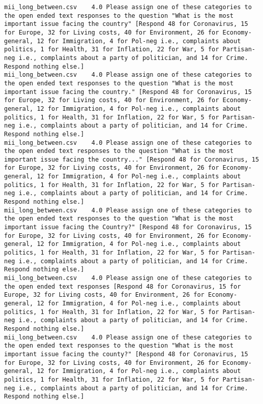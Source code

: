 \begin{lstlisting}
mii_long_between.csv	4.0	Please assign one of these categories to the open ended text responses to the question "What is the most important issue facing the country" [Respond 48 for Coronavirus, 15 for Europe, 32 for Living costs, 40 for Environment, 26 for Economy-general, 12 for Immigration, 4 for Pol-neg i.e., complaints about politics, 1 for Health, 31 for Inflation, 22 for War, 5 for Partisan-neg i.e., complaints about a party of politician, and 14 for Crime. Respond nothing else.]
mii_long_between.csv	4.0	Please assign one of these categories to the open ended text responses to the question "What is the most important issue facing the country." [Respond 48 for Coronavirus, 15 for Europe, 32 for Living costs, 40 for Environment, 26 for Economy-general, 12 for Immigration, 4 for Pol-neg i.e., complaints about politics, 1 for Health, 31 for Inflation, 22 for War, 5 for Partisan-neg i.e., complaints about a party of politician, and 14 for Crime. Respond nothing else.]
mii_long_between.csv	4.0	Please assign one of these categories to the open ended text responses to the question "What is the most important issue facing the country..." [Respond 48 for Coronavirus, 15 for Europe, 32 for Living costs, 40 for Environment, 26 for Economy-general, 12 for Immigration, 4 for Pol-neg i.e., complaints about politics, 1 for Health, 31 for Inflation, 22 for War, 5 for Partisan-neg i.e., complaints about a party of politician, and 14 for Crime. Respond nothing else.]
mii_long_between.csv	4.0	Please assign one of these categories to the open ended text responses to the question "What is the most important issue facing the Country?" [Respond 48 for Coronavirus, 15 for Europe, 32 for Living costs, 40 for Environment, 26 for Economy-general, 12 for Immigration, 4 for Pol-neg i.e., complaints about politics, 1 for Health, 31 for Inflation, 22 for War, 5 for Partisan-neg i.e., complaints about a party of politician, and 14 for Crime. Respond nothing else.]
mii_long_between.csv	4.0	Please assign one of these categories to the open ended text responses [Respond 48 for Coronavirus, 15 for Europe, 32 for Living costs, 40 for Environment, 26 for Economy-general, 12 for Immigration, 4 for Pol-neg i.e., complaints about politics, 1 for Health, 31 for Inflation, 22 for War, 5 for Partisan-neg i.e., complaints about a party of politician, and 14 for Crime. Respond nothing else.]
mii_long_between.csv	4.0	Please assign one of these categories to the open ended text responses to the question "What is the most important issue facing the county?" [Respond 48 for Coronavirus, 15 for Europe, 32 for Living costs, 40 for Environment, 26 for Economy-general, 12 for Immigration, 4 for Pol-neg i.e., complaints about politics, 1 for Health, 31 for Inflation, 22 for War, 5 for Partisan-neg i.e., complaints about a party of politician, and 14 for Crime. Respond nothing else.]

\end{lstlisting}

